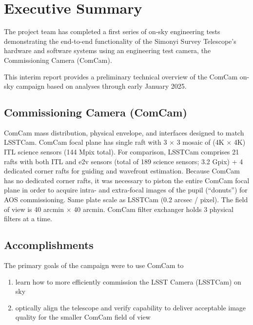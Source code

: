 \section{Executive Summary}
\label{sec:summary}

The \VeraRubinObservatory project team has completed a first series of on-sky engineering tests demonstrating the end-to-end functionality of the Simonyi Survey Telescope's hardware and software systems using an engineering test camera, the Commissioning Camera (ComCam).

\begin{note}
    This interim report provides a preliminary technical overview of the ComCam on-sky campaign based on analyses through early January 2025.
\end{note}

\emph{}

\subsection{Commissioning Camera (ComCam)}

ComCam mass distribution, physical envelope, and interfaces designed to match LSSTCam.
ComCam focal plane has single raft with 3 $\times$ 3 mosaic of (4K $\times$ 4K) ITL science sensors (144 Mpix total).
For comparison, LSSTCam comprises 21 rafts with both ITL and e2v sensors (total of 189 science sensors; 3.2 Gpix) + 4 dedicated corner rafts for guiding and wavefront estimation.
Because ComCam has no dedicated corner rafts, it was necessary to piston the entire ComCam focal plane in
order to acquire intra- and extra-focal images of the pupil (``donuts'') for AOS commissioning.
Same plate scale as LSSTCam (0.2 arcsec / pixel).
The field of view is 40 arcmin $\times$ 40 arcmin.
ComCam filter exchanger holds 3 physical filters at a time.

\subsection{Accomplishments}

The primary goals of the campaign were to use ComCam to

\begin{enumerate}
    \item learn how to more efficiently commission the LSST Camera (LSSTCam) on sky
    \item optically align the telescope and verify capability to deliver acceptable image quality for the smaller ComCam field of view
\end{enumerate}

